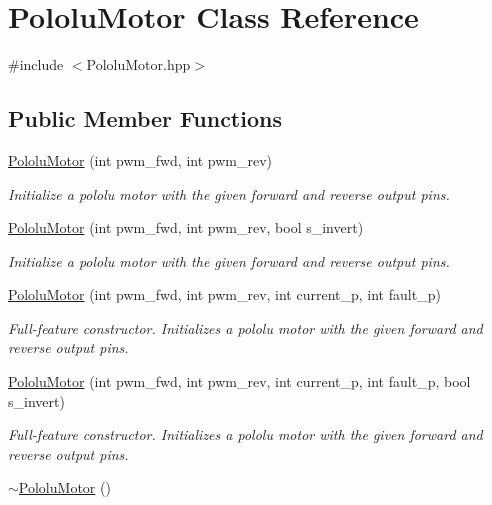 \hypertarget{class_pololu_motor}{}\section{Pololu\+Motor Class Reference}
\label{class_pololu_motor}


{\ttfamily \#include $<$Pololu\+Motor.\+hpp$>$}

\subsection*{Public Member Functions}
\begin{DoxyCompactItemize}
\item 
\hyperlink{class_pololu_motor_ac90c6552daaf283815ec7c8de8e8529d}{Pololu\+Motor} (int pwm\+\_\+fwd, int pwm\+\_\+rev)
\begin{DoxyCompactList}\small\item\em Initialize a pololu motor with the given forward and reverse output pins. \end{DoxyCompactList}\item 
\hyperlink{class_pololu_motor_a4b8a56dd118701c115379c2aa6188d01}{Pololu\+Motor} (int pwm\+\_\+fwd, int pwm\+\_\+rev, bool s\+\_\+invert)
\begin{DoxyCompactList}\small\item\em Initialize a pololu motor with the given forward and reverse output pins. \end{DoxyCompactList}\item 
\hyperlink{class_pololu_motor_a2b2d1bc93d88941bafe6ae08852c1c1a}{Pololu\+Motor} (int pwm\+\_\+fwd, int pwm\+\_\+rev, int current\+\_\+p, int fault\+\_\+p)
\begin{DoxyCompactList}\small\item\em Full-\/feature constructor. Initializes a pololu motor with the given forward and reverse output pins. \end{DoxyCompactList}\item 
\hyperlink{class_pololu_motor_ae84b8115030a9ab26be0144906ea38e5}{Pololu\+Motor} (int pwm\+\_\+fwd, int pwm\+\_\+rev, int current\+\_\+p, int fault\+\_\+p, bool s\+\_\+invert)
\begin{DoxyCompactList}\small\item\em Full-\/feature constructor. Initializes a pololu motor with the given forward and reverse output pins. \end{DoxyCompactList}\item 
\hyperlink{class_pololu_motor_a75d5d8a575dbbb8bac7b76896b3d9957}{$\sim$\+Pololu\+Motor} ()

\end{DoxyCompactItemize}
